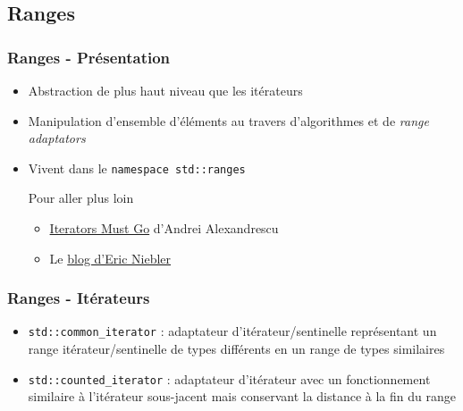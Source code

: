 \documentclass[C++.tex]{subfiles}
\begin{document}
\subsection*{Ranges}
\begin{frame}
	\frametitle{Ranges - Présentation}
	\begin{itemize}
		\item Abstraction de plus haut niveau que les itérateurs
		\item Manipulation d'ensemble d'éléments au travers d'algorithmes et de \textit{range adaptators}
		\item Vivent dans le \lstinline|namespace std::ranges|



		\begin{block}{Pour aller plus loin}
			\begin{itemize}
				\item \href{https://accu.org/content/conf2009/AndreiAlexandrescu_iterators-must-go.pdf}{\og Iterators Must Go\fg{}} d'Andrei Alexandrescu


				\item Le \href{http://ericniebler.com/}{blog d'Eric Niebler}
			\end{itemize}
		\end{block}
	\end{itemize}
\end{frame}

\begin{frame}[fragile]
	\frametitle{Ranges - Itérateurs}
	\begin{itemize}
		\item \lstinline|std::common_iterator| : adaptateur d'itérateur/sentinelle représentant un range itérateur/sentinelle de types différents en un range de types similaires


		\item \lstinline|std::counted_iterator| : adaptateur d'itérateur avec un fonctionnement similaire à l'itérateur sous-jacent mais conservant la distance à la fin du range
	\end{itemize}
\end{frame}
\end{document}
